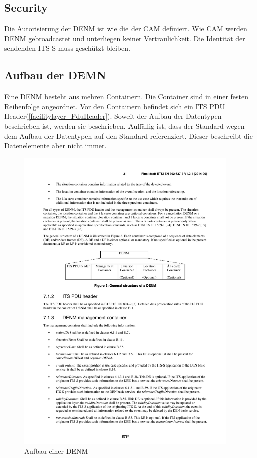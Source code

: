 \subsection{Security}
Die Autorisierung der \ac{DENM} ist wie die der \ac{CAM} definiert. Wie \ac{CAM} werden \ac{DENM} gebroadcastet und unterliegen keiner Vertraulichkeit. Die Identität der sendenden \ac{ITS-S} muss geschützt bleiben.

\subsection{Aufbau der DEMN}
Eine \ac{DENM} besteht aus mehren Containern. Die Container sind in einer festen Reihenfolge angeordnet.  Vor den Containern befindet sich ein \ac{ITS} PDU Header(\autoref{facilitylayer_PduHeader}). Soweit der Aufbau der Datentypen beschrieben ist, werden sie beschrieben. Auffällig ist, dass der Standard \cite{en302637-3} wegen dem Aufbau der Datentypen auf den Standard \cite{ts102894-2} referenziert. Dieser beschreibt die Datenelemente aber nicht immer.

\begin{figure}[htbp]
	\includegraphics[width=0.95\textwidth]{content/images/04_facilitylayer/denmAufbau.pdf}
	\caption{Aufbau einer DENM \cite{en302637-3}}
	\label{fig:darstellungdenmAufbau}
\end{figure}

